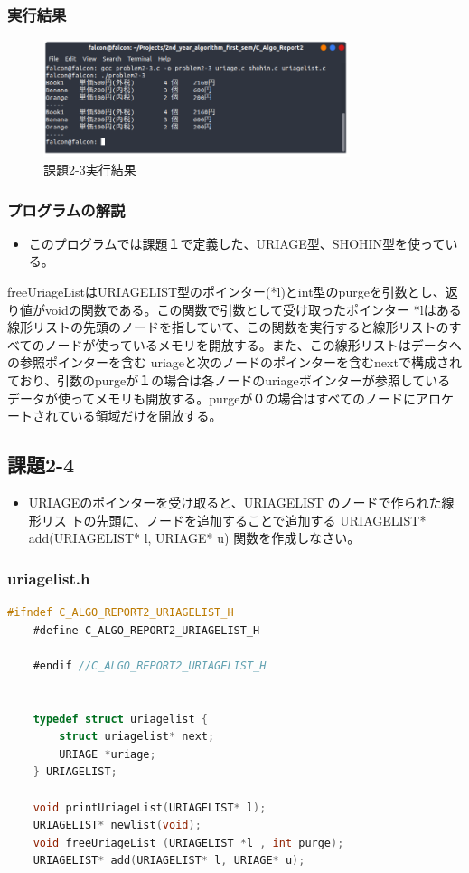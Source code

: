 \documentclass[10pt]{article}
\begin{document}
\subsubsection{実行結果}
\begin{figure}[H]
	\centering
	\includegraphics[width=0.8\textwidth]{problem2-3.png}
	\caption{課題2-3実行結果}
\end{figure}

\subsubsection{プログラムの解説}
\begin{itemize}
    \item このプログラムでは課題１で定義した、URIAGE型、SHOHIN型を使っている。
\end{itemize}

freeUriageListはURIAGELIST型のポインター(*l)とint型のpurgeを引数とし、返り値がvoidの関数である。この関数で引数として受け取ったポインター *lはある線形リストの先頭のノードを指していて、この関数を実行すると線形リストのすべてのノードが使っているメモリを開放する。また、この線形リストはデータへの参照ポインターを含む uriageと次のノードのポインターを含むnextで構成されており、引数のpurgeが１の場合は各ノードのuriageポインターが参照しているデータが使ってメモリも開放する。purgeが０の場合はすべてのノードにアロケートされている領域だけを開放する。


\subsection{課題2-4}

\begin{itemize}
    \item URIAGEのポインターを受け取ると、URIAGELIST のノードで作られた線形リス トの先頭に、ノードを追加することで追加する URIAGELIST* add(URIAGELIST* l, URIAGE* u) 関数を作成しなさい。
\end{itemize}
\subsubsection{uriagelist.h}
\begin{lstlisting}[language=C]
    #ifndef C_ALGO_REPORT2_URIAGELIST_H
    #define C_ALGO_REPORT2_URIAGELIST_H
    
    #endif //C_ALGO_REPORT2_URIAGELIST_H
    
    
    typedef struct uriagelist {
        struct uriagelist* next;
        URIAGE *uriage;
    } URIAGELIST;
    
    void printUriageList(URIAGELIST* l);
    URIAGELIST* newlist(void);
    void freeUriageList (URIAGELIST *l , int purge);
    URIAGELIST* add(URIAGELIST* l, URIAGE* u);
\end{lstlisting}
\end{document}
